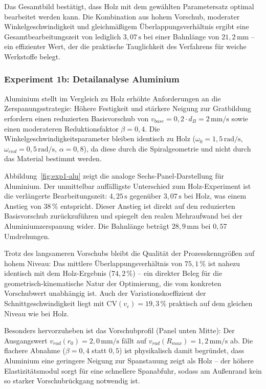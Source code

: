 ﻿\documentclass[12pt,a4paper]{article}
\begin{document}
Das Gesamtbild bestätigt, dass Holz mit dem gewählten Parametersatz optimal bearbeitet werden kann. Die Kombination aus hohem Vorschub, moderater Winkelgeschwindigkeit und gleichmäßigem Überlappungsverhältnis ergibt eine Gesamtbearbeitungszeit von lediglich $3{,}07\,\text{s}$ bei einer Bahnlänge von $21{,}2\,\text{mm}$ -- ein effizienter Wert, der die praktische Tauglichkeit des Verfahrens für weiche Werkstoffe belegt.

\subsubsection{Experiment 1b: Detailanalyse Aluminium}

Aluminium stellt im Vergleich zu Holz erhöhte Anforderungen an die Zerspanungsstrategie: Höhere Festigkeit und stärkere Neigung zur Gratbildung erfordern einen reduzierten Basisvorschub von $v_{base} = 0{,}2 \cdot d_B = 2\,\text{mm/s}$ sowie einen moderateren Reduktionsfaktor $\beta = 0{,}4$. Die Winkelgeschwindigkeitsparameter bleiben identisch zu Holz ($\omega_0 = 1{,}5\,\text{rad/s}$, $\omega_{end} = 0{,}5\,\text{rad/s}$, $\alpha = 0{,}8$), da diese durch die Spiralgeometrie und nicht durch das Material bestimmt werden.

Abbildung~\ref{fig:exp1-alu} zeigt die analoge Sechs-Panel-Darstellung für Aluminium. Der unmittelbar auffälligste Unterschied zum Holz-Experiment ist die verlängerte Bearbeitungszeit: $4{,}25\,\text{s}$ gegenüber $3{,}07\,\text{s}$ bei Holz, was einem Anstieg von $38\,\%$ entspricht. Dieser Anstieg ist direkt auf den reduzierten Basisvorschub zurückzuführen und spiegelt den realen Mehraufwand bei der Aluminiumzerspanung wider. Die Bahnlänge beträgt $28{,}9\,\text{mm}$ bei $0{,}57$ Umdrehungen.

Trotz des langsameren Vorschubs bleibt die Qualität der Prozesskenngrößen auf hohem Niveau: Das mittlere Überlappungsverhältnis von $75{,}1\,\%$ ist nahezu identisch mit dem Holz-Ergebnis ($74{,}2\,\%$) -- ein direkter Beleg für die geometrisch-kinematische Natur der Optimierung, die vom konkreten Vorschubwert unabhängig ist. Auch der Variationskoeffizient der Schnittgeschwindigkeit liegt mit $\mathrm{CV}(v_c) = 19{,}3\,\%$ praktisch auf dem gleichen Niveau wie bei Holz.

Besonders hervorzuheben ist das Vorschubprofil (Panel unten Mitte): Der Ausgangswert $v_{rad}(r_0) = 2{,}0\,\text{mm/s}$ fällt auf $v_{rad}(R_{max}) = 1{,}2\,\text{mm/s}$ ab. Die flachere Abnahme ($\beta = 0{,}4$ statt $0{,}5$) ist physikalisch damit begründet, dass Aluminium eine geringere Neigung zur Spanstauung zeigt als Holz -- der höhere Elastizitätsmodul sorgt für eine schnellere Spanabfuhr, sodass am Außenrand kein so starker Vorschubrückgang notwendig ist.
\end{document}
